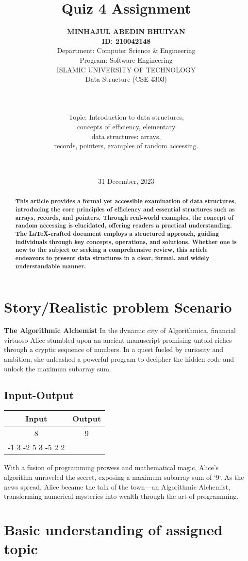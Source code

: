 \documentclass[12pt, a4paper]{report}
\title{\Huge\textbf{Quiz 4 Assignment}}
\author{
    \large \textbf{MINHAJUL ABEDIN BHUIYAN}\\
    \textbf{ID: 210042148}\\
    Department: Computer Science \& Engineering\\
    Program: Software Engineering\\
    \large ISLAMIC UNIVERSITY OF TECHNOLOGY\\ 
    Data Structure (CSE 4303)\\\\
    \\\\Topic: Introduction to data structures, 
    \\concepts of efficiency, elementary 
    \\data structures: arrays,
    \\records, pointers, examples of random accessing.\\\\\\
}
\date{31 December, 2023}
\begin{document}
\maketitle
\newpage

\begin{abstract}
\textbf{This article provides a formal yet accessible examination of data structures, introducing the core principles of efficiency and essential structures such as arrays, records, and pointers. Through real-world examples, the concept of random accessing is elucidated, offering readers a practical understanding. The LaTeX-crafted document employs a structured approach, guiding individuals through key concepts, operations, and solutions. Whether one is new to the subject or seeking a comprehensive review, this article endeavors to present data structures in a clear, formal, and widely understandable manner.}
\end{abstract}

\newpage

\section*{Story/Realistic problem Scenario}

\textbf{The Algorithmic Alchemist}
In the dynamic city of Algorithmica, financial virtuoso Alice stumbled upon an ancient manuscript promising untold riches through a cryptic sequence of numbers. In a quest fueled by curiosity and ambition, she unleashed a powerful program to decipher the hidden code and unlock the maximum subarray sum.
\subsection*{Input-Output}
\begin{center}
\begin{tabular}{|c|c|}
\hline
\textbf{Input} & \textbf{Output} \\
\hline
8 & 9 \\
-1 3 -2 5 3 -5 2 2 & \\
\hline
\end{tabular}
\end{center}
With a fusion of programming prowess and mathematical magic, Alice's algorithm unraveled the secret, exposing a maximum subarray sum of `9`. As the news spread, Alice became the talk of the town—an Algorithmic Alchemist, transforming numerical mysteries into wealth through the art of programming.

\section*{Basic understanding of assigned topic}
\end{document}
